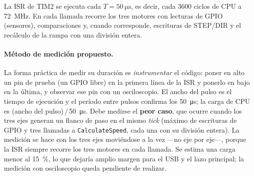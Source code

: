 La ISR de TIM2 se ejecuta cada $T=\SI{50}{\micro\second}$, es decir, cada 3600 ciclos de CPU a
\SI{72}{\mega\hertz}. En cada llamada recorre los tres motores con lecturas de GPIO (sensores),
comparaciones y, cuando corresponde, escrituras de STEP/DIR y el recálculo de la rampa con una
división entera.

\paragraph{Método de medición propuesto.} La forma práctica de medir su duración es
\emph{instrumentar} el código: poner en alto un pin de prueba (un GPIO libre) en la primera línea
de la ISR y ponerlo en bajo en la última, y observar ese pin con un osciloscopio. El ancho del
pulso es el tiempo de ejecución y el período entre pulsos confirma los \SI{50}{\micro\second}; la
carga de CPU es (ancho del pulso)\,/\,\SI{50}{\micro\second}. Debe medirse el \textbf{peor caso},
que ocurre cuando los tres ejes generan un flanco de paso en el mismo \emph{tick} (máximo de
escrituras de GPIO y tres llamadas a \texttt{CalculateSpeed}, cada una con su división entera).
La medición se hace con los tres ejes moviéndose a la vez —no eje por eje—, porque la ISR siempre
recorre los tres motores en cada llamada. Se estima una carga menor al 15~\%, lo que dejaría
amplio margen para el USB y el lazo principal; la medición con osciloscopio queda pendiente de
realizar.
